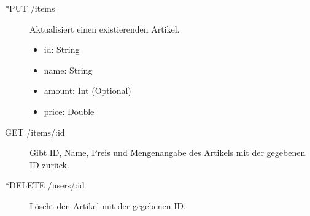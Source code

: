 \begin{description}
	\item[*PUT /items] Aktualisiert einen existierenden Artikel.
	\begin{itemize}
		\item id: String
		\item name: String
		\item amount: Int (Optional)
		\item price: Double
	\end{itemize}
	
	\item[GET /items/:id] Gibt ID, Name, Preis und Mengenangabe des Artikels mit der gegebenen ID zurück.
	
	\item[*DELETE /users/:id] Löscht den Artikel mit der gegebenen ID.
\end{description}
